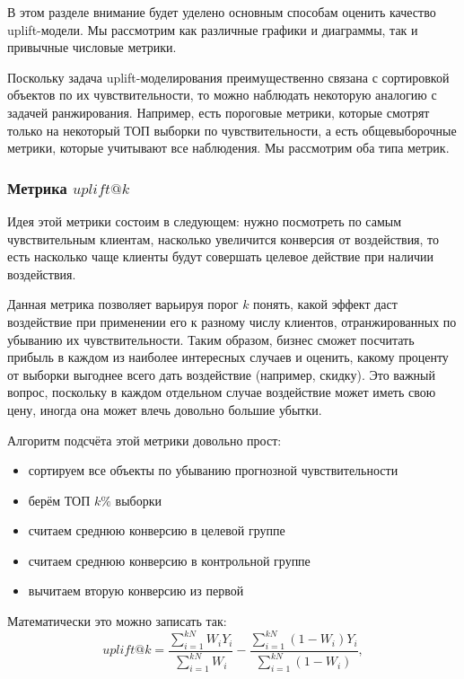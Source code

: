 В этом разделе внимание будет уделено основным способам оценить качество uplift-модели. Мы рассмотрим как различные графики и диаграммы, так и привычные числовые метрики.

Поскольку задача uplift-моделирования преимущественно связана с сортировкой объектов по их чувствительности, то можно наблюдать некоторую аналогию с задачей ранжирования. Например, есть пороговые метрики, которые смотрят только на некоторый ТОП выборки по чувствительности, а есть общевыборочные метрики, которые учитывают все наблюдения. Мы рассмотрим оба типа метрик.



\subsubsection*{Метрика $uplift@k$}

Идея этой метрики состоим в следующем: нужно посмотреть по самым чувствительным клиентам, насколько увеличится конверсия от воздействия, то есть насколько чаще клиенты будут совершать целевое действие при наличии воздействия.

Данная метрика позволяет варьируя порог $k$ понять, какой эффект даст воздействие при применении его к разному числу клиентов, отранжированных по убыванию их чувствительности. Таким образом, бизнес сможет посчитать прибыль в каждом из наиболее интересных случаев и оценить, какому проценту от выборки выгоднее всего дать воздействие (например, скидку). Это важный вопрос, поскольку в каждом отдельном случае воздействие может иметь свою цену, иногда она может влечь довольно большие убытки.

Алгоритм подсчёта этой метрики довольно прост:
\begin{itemize}
    \item сортируем все объекты по убыванию прогнозной чувствительности
    \item берём ТОП $k\%$ выборки
    \item считаем среднюю конверсию в целевой группе 
    \item считаем среднюю конверсию в контрольной группе
    \item вычитаем вторую конверсию из первой
\end{itemize}

Математически это можно записать так:
$$
    uplift@k =
        \frac{
            \sum\limits_{i=1}^{kN} W_i Y_i
        }{
            \sum\limits_{i=1}^{kN} W_i
        }
        -
        \frac{
            \sum\limits_{i=1}^{kN} (1 - W_i) Y_i
        }{
            \sum\limits_{i=1}^{kN} (1 - W_i)
        }
    ,
$$

